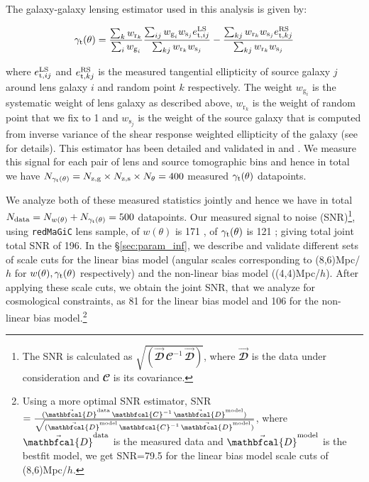 \documentclass[aps, prd,twocolumn,superscriptaddress,nofootinbib,preprintnumbers]{revtex4-1}
\newcommand{\gammat}{\ensuremath{\gamma_{\rm t}(\theta)}}
\newcommand{\wtheta}{\ensuremath{w(\theta)}}
\newcommand{\redmagic}{\texttt{redMaGiC} }
\begin{document}
The galaxy-galaxy lensing estimator used in this analysis is given by:
\begin{linenomath*}
\begin{equation}
    \gamma_{\rm t}(\theta) = \frac{\sum_k w_{\textrm{r}_k}}{\sum_i w_{\textrm{g}_i}} \frac{\sum_{ij} w_{\textrm{g}_i} w_{\textrm{s}_j} e^{\rm LS}_{{\rm t},ij}}{\sum_{kj} w_{\textrm{r}_k} w_{\textrm{s}_j}} - \frac{\sum_{kj} w_{\textrm{r}_k} w_{\textrm{s}_j} e^{\rm RS}_{{\rm t},kj}}{\sum_{kj} w_{\textrm{r}_k} w_{\textrm{s}_j}}
\end{equation}
\end{linenomath*}
where $e^{\rm LS}_{{\rm t},ij}$ and $e^{\rm RS}_{{\rm t},kj}$ is the measured tangential ellipticity of source galaxy $j$ around lens galaxy $i$ and random point $k$ respectively. The weight $w_{\textrm{g}_i}$ is the systematic weight of lens galaxy as described above, $w_{\textrm{r}_k}$ is the weight of random point that we fix to 1 and $w_{\textrm{s}_j}$ is the weight of the source galaxy that is computed from inverse variance of the shear response weighted ellipticity of the galaxy (see \citet*{y3-shapecatalog} for details). 
This estimator has been detailed and validated in \citet{Singh_2017} and \citet*{y3-gglensing}. We measure this signal for each pair of lens and source tomographic bins and hence in total we have  $N_{\gammat} = N_{\rm z,g} \times N_{\rm z,s} \times N_{\theta} = 400$ measured $\gammat$ datapoints. 

We analyze both of these measured statistics jointly and hence we have in total $N_{\rm data} = N_{\wtheta} + N_{\gammat} = 500$ datapoints. Our measured signal to noise (SNR)\footnote{The SNR is calculated as $\sqrt{(\vec{\mathbfcal{D}}\, {\mathbfcal{C}}^{-1}\,  \vec{\mathbfcal{D}})}$, where $\vec{\mathbfcal{D}}$ is the data under consideration and $\mathbfcal{C}$ is its covariance.}, using \redmagic lens sample, of $\wtheta$ is 171 \citep{y3-galaxyclustering}, of  $\gammat$ is 121 \citep{y3-gglensing}; giving total joint total SNR of 196. In the \S\ref{sec:param_inf}, we describe and validate different sets of scale cuts for the linear bias model (angular scales corresponding to (8,6)Mpc/$h$ for $w(\theta),\gamma_{\rm t}(\theta)$ respectively) and the non-linear bias model ((4,4)Mpc/$h$). After applying these scale cuts, we obtain the joint SNR, that we analyze for cosmological constraints, as 81 for the linear bias model and 106 for the non-linear bias model.\footnote{Using a more optimal SNR estimator, SNR$= \frac{(\vec{\mathbfcal{D}}^{\rm data}\, {\mathbfcal{C}}^{-1}\,  \vec{\mathbfcal{D}}^{\rm model})}{\sqrt{(\vec{\mathbfcal{D}}^{\rm model}\, {\mathbfcal{C}}^{-1}\,  \vec{\mathbfcal{D}}^{\rm model})}}$, where $\vec{\mathbfcal{D}}^{\rm data}$ is the measured data and $\vec{\mathbfcal{D}}^{\rm model}$ is the bestfit model, we get SNR=79.5 for the linear bias model scale cuts of (8,6)Mpc/$h$.} 
\end{document}

